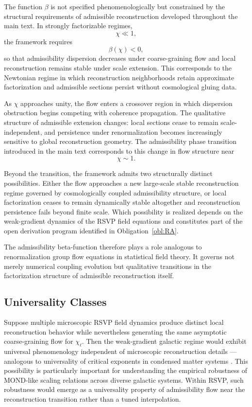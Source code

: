 \documentclass[11pt, a4paper]{article}
\theoremstyle{plain}
\theoremstyle{definition}
\theoremstyle{remark}
\begin{document}
The function $\beta$ is not specified phenomenologically but constrained by the
structural requirements of admissible reconstruction developed throughout the main
text.  In strongly factorizable regimes,
\[
  \chi \ll 1,
\]
the framework requires
\[
  \beta(\chi) < 0,
\]
so that admissibility dispersion decreases under coarse-graining flow and local
reconstruction remains stable under scale extension.  This corresponds to the
Newtonian regime in which reconstruction neighborhoods retain approximate
factorization and admissible sections persist without cosmological gluing data.

As $\chi$ approaches unity, the flow enters a crossover region in which dispersion
obstruction begins competing with coherence propagation.  The qualitative structure
of admissible extension changes: local sections cease to remain scale-independent,
and persistence under renormalization becomes increasingly sensitive to global
reconstruction geometry.  The admissibility phase transition introduced in the main
text corresponds to this change in flow structure near
\[
  \chi \sim 1.
\]

Beyond the transition, the framework admits two structurally distinct possibilities.
Either the flow approaches a new large-scale stable reconstruction regime governed
by cosmologically coupled admissibility structure, or local factorization ceases to
remain dynamically stable altogether and reconstruction persistence fails beyond
finite scale.  Which possibility is realized depends on the weak-gradient dynamics
of the RSVP field equations and constitutes part of the open derivation program
identified in Obligation~\ref{obl:RA}.

The admissibility beta-function therefore plays a role analogous to renormalization
group flow equations in statistical field theory.  It governs not merely numerical
coupling evolution but qualitative transitions in the factorization structure of
admissible reconstruction itself.

\subsection{Universality Classes}

Suppose multiple microscopic RSVP field dynamics produce distinct local
reconstruction behavior while nevertheless generating the same asymptotic
coarse-graining flow for $\chi_\ell$. Then the weak-gradient galactic regime would
exhibit universal phenomenology independent of microscopic reconstruction details ---
analogous to universality of critical exponents in condensed matter systems
\cite{goldenfeld1992}. This possibility is particularly important for understanding
the empirical robustness of MOND-like scaling relations \cite{mcgaugh2011,famaey2012}
across diverse galactic systems. Within RSVP, such robustness would emerge as a
universality property of admissibility flow near the reconstruction transition rather
than a tuned interpolation.
\end{document}
